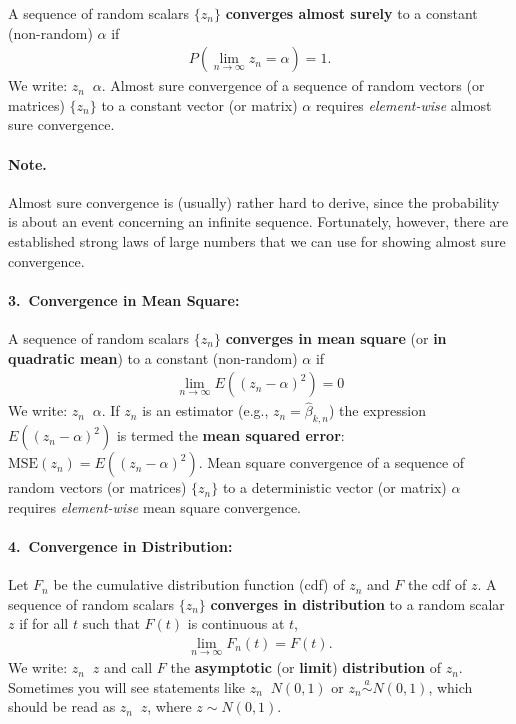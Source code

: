 \documentclass[
  14pt,
]{memoir}
\DeclareMathOperator{\toas}{\overset{a.s.}{\longrightarrow}}
\DeclareMathOperator{\toms}{\overset{m.s.}{\longrightarrow}}
\DeclareMathOperator{\todistr}{\overset{d}{\longrightarrow}}
\begin{document}
A sequence of random scalars \(\{z_n\}\) \textbf{converges almost surely} to a constant (non-random) \(\alpha\) if
\begin{eqnarray*}
P\left(\lim_{n\to\infty}z_n=\alpha\right)=1.
\end{eqnarray*}
We write: \(z_n\toas\alpha\). Almost sure convergence of a sequence of random vectors (or matrices) \(\{z_n\}\) to a constant vector (or matrix) \(\alpha\) requires \emph{element-wise} almost sure convergence.

\paragraph*{Note.}

Almost sure convergence is (usually) rather hard to derive, since the probability is about an event concerning an infinite sequence. Fortunately, however, there are established strong laws of large numbers that we can use for showing almost sure convergence.

\paragraph*{3.~Convergence in Mean Square:}

A sequence of random scalars \(\{z_n\}\) \textbf{converges in mean square} (or \textbf{in quadratic mean}) to a constant (non-random) \(\alpha\) if
\begin{eqnarray*}
  \lim_{n\to\infty}E\left((z_n-\alpha)^2\right)=0
\end{eqnarray*}
We write: \(z_n\toms\alpha\). If \(z_n\) is an estimator (e.g., \(z_n=\hat\beta_{k,n}\)) the expression \(E\left((z_n-\alpha)^2\right)\) is termed the \textbf{mean squared error}: \(\text{MSE}(z_n)=E\left((z_n-\alpha)^2\right)\). Mean square convergence of a sequence of random vectors (or matrices) \(\{z_n\}\) to a deterministic vector (or matrix) \(\alpha\) requires \emph{element-wise} mean square convergence.

\paragraph*{4.~Convergence in Distribution:}

Let \(F_n\) be the cumulative distribution function (cdf) of \(z_n\) and \(F\) the cdf of \(z\). A sequence of random scalars \(\{z_n\}\) \textbf{converges in distribution} to a random scalar \(z\) if for all \(t\) such that \(F(t)\) is continuous at \(t\),
\begin{eqnarray*}
  \lim_{n\to\infty}F_n(t)=F(t).
\end{eqnarray*}
We write: \(z_n\todistr z\) and call \(F\) the \textbf{asymptotic} (or \textbf{limit}) \textbf{distribution} of \(z_n\). Sometimes you will see statements like \(z_n\todistr N(0,1)\) or \(z_n\overset{a}{\sim}N(0,1)\), which should be read as \(z_n\todistr z\), where \(z\sim N(0,1)\).
\end{document}
